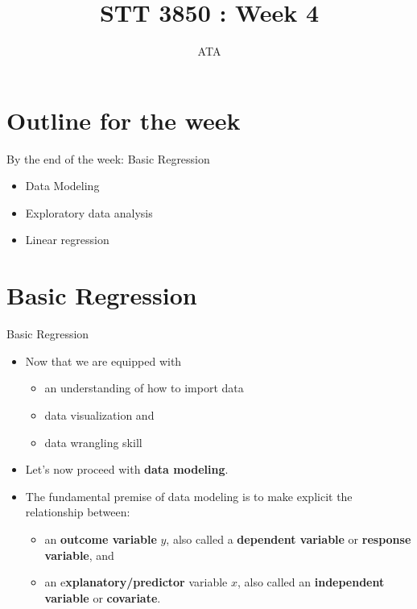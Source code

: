 \documentclass[
  ignorenonframetext,
]{beamer}
\title{STT 3850 : Week 4}
\author{ATA}
\date{}
\institute{Appalachian State University}
\providecommand{\tightlist}{%
  \setlength{\itemsep}{0pt}\setlength{\parskip}{0pt}}
\begin{document}
\frame{\titlepage}

\section{Outline for the week}\label{outline-for-the-week}

\begin{frame}{By the end of the week: Basic Regression}
\label{by-the-end-of-the-week-basic-regression}
\begin{itemize}
\tightlist
\item
  Data Modeling
\item
  Exploratory data analysis
\item
  Linear regression
\end{itemize}
\end{frame}

\section{Basic Regression}\label{basic-regression}

\begin{frame}{Basic Regression}
\label{basic-regression-1}
\begin{itemize}
\item
  Now that we are equipped with

  \begin{itemize}
  \tightlist
  \item
    an understanding of how to import data
  \item
    data visualization and
  \item
    data wrangling skill
  \end{itemize}
\item
  Let's now proceed with \textbf{data modeling}.
\item
  The fundamental premise of data modeling is to make explicit the
  relationship between:

  \begin{itemize}
  \tightlist
  \item
    an \textbf{outcome variable} \(y\), also called a \textbf{dependent
    variable} or \textbf{response variable}, and
  \item
    an e\textbf{xplanatory/predictor} variable \(x\), also called an
    \textbf{independent variable} or \textbf{covariate}.
  \end{itemize}
\end{itemize}
\end{frame}
\end{document}
